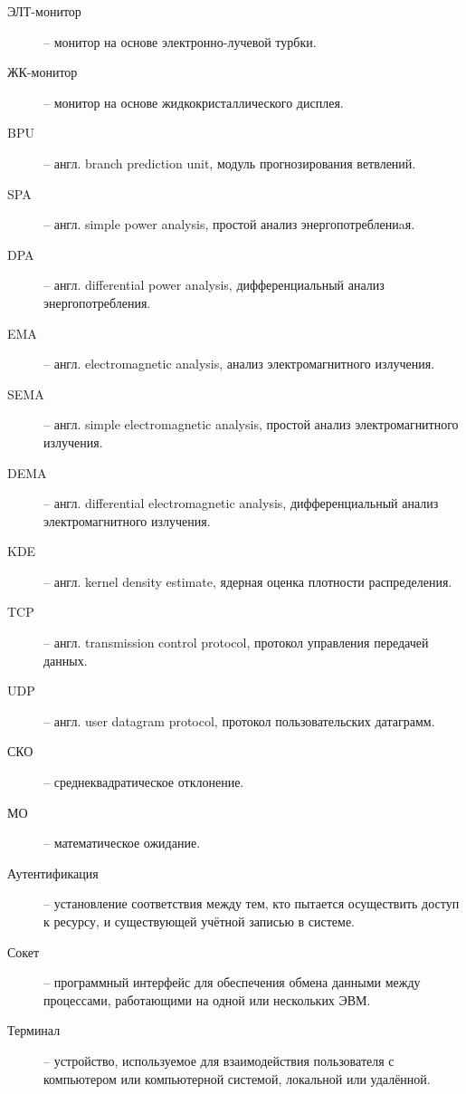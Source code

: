 
\begin{description}
\item[ЭЛТ-монитор] -- монитор на основе электронно-лучевой турбки.
\item[ЖК-монитор] -- монитор на основе жидкокристаллического дисплея.
\item[BPU] -- англ. branch prediction unit, модуль прогнозирования ветвлений.
\item[SPA] -- англ. simple power analysis, простой анализ энергопотреблениaя.
\item[DPA] -- англ. differential power analysis, дифференциальный анализ
  энергопотребления.
\item[EMA] -- англ. electromagnetic analysis, анализ электромагнитного
  излучения.
\item[SEMA] -- англ. simple electromagnetic analysis, простой анализ
  электромагнитного излучения.
\item[DEMA] -- англ. differential electromagnetic analysis, дифференциальный
  анализ электромагнитного излучения.
\item[KDE] -- англ. kernel density estimate, ядерная оценка плотности распределения.
\item[TCP] -- англ. transmission control protocol, протокол управления передачей данных.
\item[UDP] -- англ. user datagram protocol, протокол пользовательских датаграмм.
\item[СКО] -- среднеквадратическое отклонение.
\item[МО] -- математическое ожидание.
\end{description}

\clearpage


\begin{description}
\item[Аутентификация] -- установление соответствия между тем, кто пытается осуществить доступ к ресурсу, и существующей учётной записью в системе.
\item[Сокет] -- программный интерфейс для обеспечения обмена данными между процессами, работающими на одной или нескольких ЭВМ.
\item[Терминал] -- устройство, используемое для взаимодействия пользователя с компьютером или компьютерной системой, локальной или удалённой.
\end{description}

\clearpage
